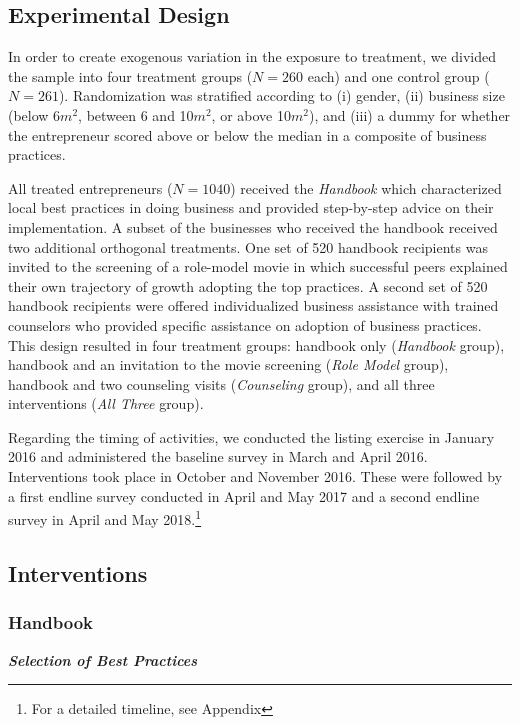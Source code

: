 \documentclass[11.5pt]{article}
\begin{document}
\subsection{Experimental Design}

In order to create exogenous variation in the exposure to treatment, we divided the sample into four treatment groups ($N = 260$ each) and one control group ($N = 261$). Randomization was stratified according to (i) gender, (ii) business size (below 6$m^2$, between 6 and 10$m^2$, or above 10$m^2$), and (iii) a dummy for whether the entrepreneur scored above or below the median in a composite of business practices.

All treated entrepreneurs ($N = 1040$) received the \emph{Handbook} which characterized local best practices in doing business and provided step-by-step advice on their implementation. A subset of the businesses who received the handbook received two additional orthogonal treatments. One set of 520 handbook recipients was invited to the screening of a role-model movie in which successful peers explained their own trajectory of growth adopting the top practices. A second set of 520 handbook recipients were offered individualized business assistance with trained counselors who provided specific assistance on adoption of business practices. This design resulted in four treatment groups: handbook only (\emph{Handbook} group), handbook and an invitation to the movie screening (\emph{Role Model} group), handbook and two counseling visits (\emph{Counseling} group), and all three interventions (\emph{All Three} group).

Regarding the timing of activities, we conducted the listing exercise in January 2016 and administered the baseline survey in March and April 2016. Interventions took place in October and November 2016. These were followed by a first endline survey conducted in April and May 2017 and a second endline survey in April and May 2018.\footnote{For a detailed timeline, see Appendix %
}

\subsection{Interventions}

\subsubsection{Handbook}

\emph{\textbf{Selection of Best Practices}}\
\end{document}

